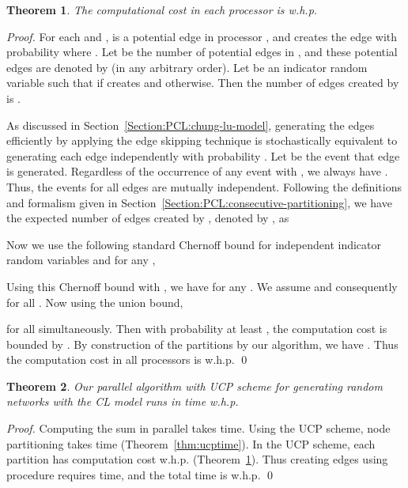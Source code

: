 \documentclass[conference,letterpaper,10pt]{IEEEtran}
\newtheorem{theorem}{Theorem}
\begin{document}
\begin{theorem}\label{thm:comp_load}
The computational cost in each processor is   w.h.p.	
\end{theorem}
\begin{proof}
For each   and ,   is a potential edge in processor , and  creates the edge with probability   where . Let  be the number of potential edges in , and these potential edges are denoted by   (in any arbitrary order). Let   be an indicator random variable such that   if   creates   and   otherwise. Then the number of edges created by   is . 

As discussed in Section~\ref{Section:PCL:chung-lu-model}, generating the edges efficiently by applying the edge skipping technique is stochastically equivalent to generating each edge  independently with probability . Let  be the event that edge  is generated. Regardless of the occurrence of any event  with , we always have . Thus, the events  for all edges  are mutually independent. Following the definitions and formalism given in Section~\ref{Section:PCL:consecutive-partitioning}, we have the expected number of edges created by , denoted by , as 

Now we use the following standard Chernoff  bound for independent indicator random variables and for any , 
 
Using this Chernoff  bound with , we have 
 for any . We assume   and consequently   for all . Now using the union bound, 

for all   simultaneously. 
Then with probability at least , the computation cost  is bounded by . By
construction of the partitions by our algorithm, we have . Thus the computation cost in all processors is  w.h.p.
\qed
\end{proof}

\begin{theorem}\label{thm:chunglutime}
Our parallel algorithm with UCP  scheme for generating random networks with the CL model runs in   time w.h.p.
\end{theorem}

\begin{proof}
Computing the sum   in parallel takes   time. Using the UCP  scheme, node partitioning takes  time (Theorem~\ref{thm:ucptime}). In the UCP  scheme, each partition has   computation cost w.h.p. (Theorem~\ref{thm:comp_load}). Thus creating edges using procedure  requires   time, and the total time is  w.h.p.
\qed
\end{proof}
\end{document}
